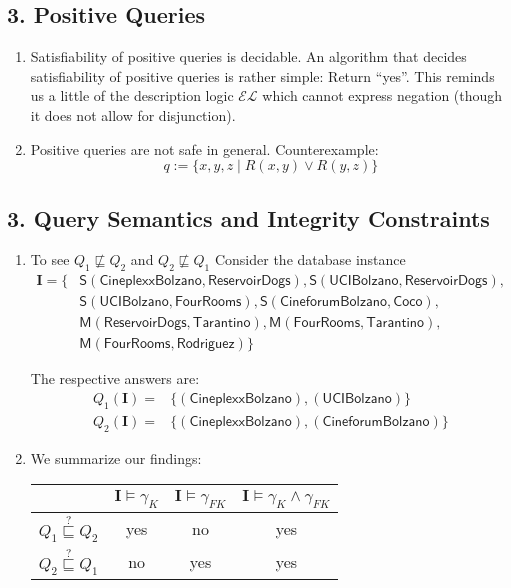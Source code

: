 \documentclass[a4paper,12pt]{article}
\begin{document}
\subsection*{3. Positive Queries}

\begin{enumerate}
	\item Satisfiability of positive queries is decidable. An algorithm that decides satisfiability of positive queries is rather simple: Return \enquote{yes}. This reminds us a little of the description logic $\mathcal{EL}$ which cannot express negation (though it does not allow for disjunction).
	\item Positive queries are not safe in general. Counterexample: $$q := \{ x, y, z \mid R(x,y) \lor R(y,z) \}$$
\end{enumerate}

\subsection*{3. Query Semantics and Integrity Constraints}

\begin{enumerate}
	\item To see $Q_1 \not \sqsubseteq Q_2$ and $Q_2 \not \sqsubseteq Q_1$ Consider the database instance \begin{align*}\textbf{I} = \{ &\mathsf{S}(\mathsf{CineplexxBolzano}, \mathsf{ReservoirDogs}), \mathsf{S}(\mathsf{UCIBolzano}, \mathsf{ReservoirDogs}),&\\ &\mathsf{S}(\mathsf{UCIBolzano}, \mathsf{FourRooms}), \mathsf{S}(\mathsf{CineforumBolzano}, \mathsf{Coco}),&\\ &\mathsf{M}(\mathsf{ReservoirDogs}, \mathsf{Tarantino}), \mathsf{M}(\mathsf{FourRooms}, \mathsf{Tarantino}),\\ &\mathsf{M}(\mathsf{FourRooms}, \mathsf{Rodriguez})\}\end{align*}
	
	The respective answers are:
	\begin{align*}
		Q_1(\textbf{I}) =& \{ (\mathsf{CineplexxBolzano}), (\mathsf{UCIBolzano}) \} \\
		Q_2(\textbf{I}) =& \{ (\mathsf{CineplexxBolzano}), (\mathsf{CineforumBolzano}) \}
	\end{align*}

	\item We summarize our findings:
		\begin{table}[h!]
		\begin{center}
		\begin{tabular}{|c|c|c|c|}
			\hline
			& $\textbf{I} \models \gamma_K$ & $\textbf{I} \models \gamma_{FK}$ & $\textbf{I} \models \gamma_K \wedge \gamma_{FK}$ \\
			\hline
			$Q_1 \stackrel{?}{\sqsubseteq} Q_2$ & yes & no & yes \\
			$Q_2 \stackrel{?}{\sqsubseteq} Q_1$ & no & yes & yes \\
			\hline
		\end{tabular}
		\end{center}
		\end{table}
\end{enumerate}
\end{document}
